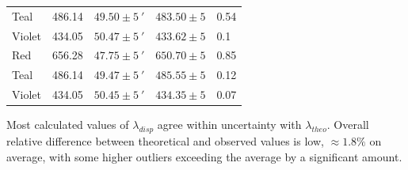 \documentclass[10pt, twocolumn]{article}
\theoremstyle{definition}
\begin{document}
\begin{table}[ht!]
\begin{tabular}{lllll}
    Teal   & 486.14                                  & $49.50 \pm \qty{5}{\arcminute}$ & $483.50 \pm 5$                          & 0.54    \\
    Violet & 434.05                                  & $50.47 \pm \qty{5}{\arcminute}$ & $433.62 \pm 5$                          & 0.1     \\
    \midrule
    Red    & 656.28                                  & $47.75 \pm \qty{5}{\arcminute}$ & $650.70 \pm 5$                          & 0.85    \\
    Teal   & 486.14                                  & $49.47 \pm \qty{5}{\arcminute}$ & $485.55 \pm 5$                          & 0.12    \\
    Violet & 434.05                                  & $50.45 \pm \qty{5}{\arcminute}$ & $434.35 \pm 5$                          & 0.07    \\
    \bottomrule
  \end{tabular}
  \label{t1}
\end{table}
Most calculated values of $\lambda_{disp}$ agree within uncertainty with $\lambda_{theo}$. Overall relative difference between theoretical and observed values is
low, $\approx1.8\%$ on average, with some higher outliers exceeding the average by a significant amount.
\vfill\eject
\end{document}
